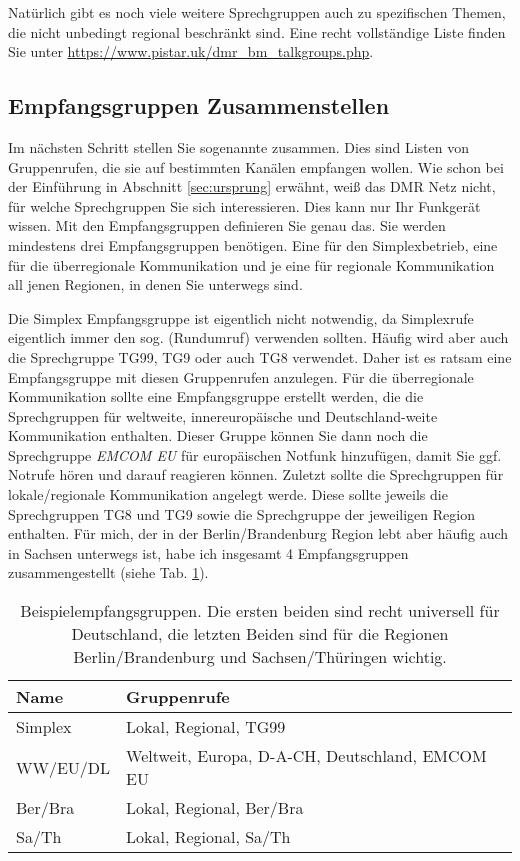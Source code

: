 Natürlich gibt es noch viele weitere Sprechgruppen auch zu spezifischen Themen, die nicht unbedingt regional beschränkt sind. Eine recht vollständige Liste finden Sie unter \url{https://www.pistar.uk/dmr_bm_talkgroups.php}.


\subsection{Empfangsgruppen Zusammenstellen} \label{sec:cp:grouplist}
Im nächsten Schritt stellen Sie sogenannte  zusammen. Dies sind Listen von Gruppenrufen, die sie auf bestimmten Kanälen empfangen wollen. Wie schon bei der Einführung in Abschnitt \ref{sec:ursprung} erwähnt, weiß das DMR Netz nicht, für welche Sprechgruppen Sie sich interessieren. Dies kann nur Ihr Funkgerät wissen. Mit den Empfangsgruppen definieren Sie genau das. Sie werden mindestens drei Empfangsgruppen benötigen. Eine für den Simplexbetrieb, eine für die überregionale Kommunikation und je eine für regionale Kommunikation all jenen Regionen, in denen Sie unterwegs sind.

Die Simplex Empfangsgruppe ist eigentlich nicht notwendig, da Simplexrufe eigentlich immer den sog.  (Rundumruf) verwenden sollten. Häufig wird aber auch die Sprechgruppe TG99, TG9 oder auch TG8 verwendet. Daher ist es ratsam eine Empfangsgruppe mit diesen Gruppenrufen anzulegen. Für die überregionale Kommunikation sollte eine Empfangsgruppe erstellt werden, die die Sprechgruppen für weltweite, innereuropäische und Deutschland-weite Kommunikation enthalten. Dieser Gruppe können Sie dann noch die Sprechgruppe \emph{EMCOM EU} für europäischen Notfunk hinzufügen, damit Sie ggf. Notrufe hören und darauf reagieren können. Zuletzt sollte die Sprechgruppen für lokale/regionale Kommunikation angelegt werde. Diese sollte jeweils die Sprechgruppen TG8 und TG9 sowie die Sprechgruppe der jeweiligen Region enthalten. Für mich, der in der Berlin/Brandenburg Region lebt aber häufig auch in Sachsen unterwegs ist, habe ich insgesamt 4 Empfangsgruppen zusammengestellt (siehe Tab. \ref{tab:grouplist}).
  
\begin{table}
 \centering
 \begin{tabular}{|l|l|} \hline
 Name     & Gruppenrufe \\ \hline
 Simplex  & Lokal, Regional, TG99 \\
 WW/EU/DL & Weltweit, Europa, D-A-CH, Deutschland, EMCOM EU \\
 Ber/Bra  & Lokal, Regional, Ber/Bra \\
 Sa/Th    & Lokal, Regional, Sa/Th \\ \hline
 \end{tabular}
 \caption{Beispielempfangsgruppen. Die ersten beiden sind recht universell für Deutschland, die letzten Beiden sind für die Regionen Berlin/Brandenburg und Sachsen/Thüringen wichtig.} \label{tab:grouplist}
\end{table}


